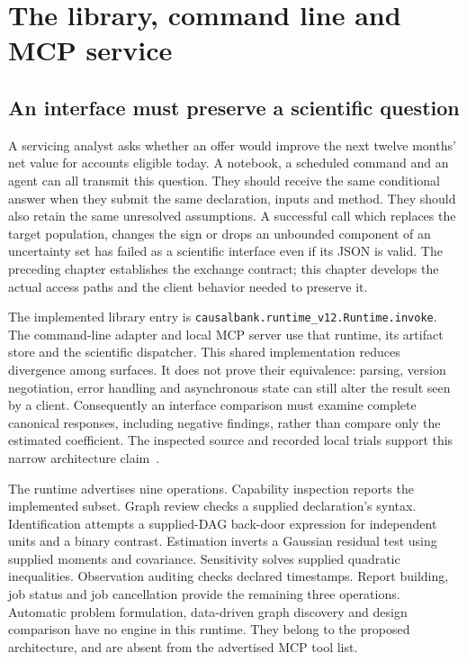 \chapter{The library, command line and MCP service}
\label{in:surfaces}
\label{exec13:i2-start}

\section{An interface must preserve a scientific question}

A servicing analyst asks whether an offer would improve the next twelve
months' net value for accounts eligible today. A notebook, a scheduled command
and an agent can all transmit this question. They should receive the same
conditional answer when they submit the same declaration, inputs and method.
They should also retain the same unresolved assumptions. A successful call
which replaces the target population, changes the sign or drops an unbounded
component of an uncertainty set has failed as a scientific interface even if
its JSON is valid. The preceding chapter establishes the exchange contract;
this chapter develops the actual access paths and the client behavior needed
to preserve it.

The implemented library entry is
\texttt{causalbank.runtime\_v12.Runtime.invoke}. The command-line adapter and
local MCP server use that runtime, its artifact store and the scientific
dispatcher. This shared implementation reduces divergence among surfaces.
It does not prove their equivalence: parsing, version negotiation, error
handling and asynchronous state can still alter the result seen by a client.
Consequently an interface comparison must examine complete canonical responses,
including negative findings, rather than compare only the estimated coefficient.
The inspected source and recorded local trials support this narrow architecture
claim~\citep{v12_in_runtime,exec13_i2_examples}.

The runtime advertises nine operations. Capability inspection reports the
implemented subset. Graph review checks a supplied declaration's syntax.
Identification attempts a supplied-DAG back-door expression for independent
units and a binary contrast. Estimation inverts a Gaussian residual test using
supplied moments and covariance. Sensitivity solves supplied quadratic
inequalities. Observation auditing checks declared timestamps. Report building,
job status and job cancellation provide the remaining three operations.
Automatic problem formulation, data-driven graph discovery and design
comparison have no engine in this runtime. They belong to the proposed
architecture, and are absent from the advertised MCP tool list.

